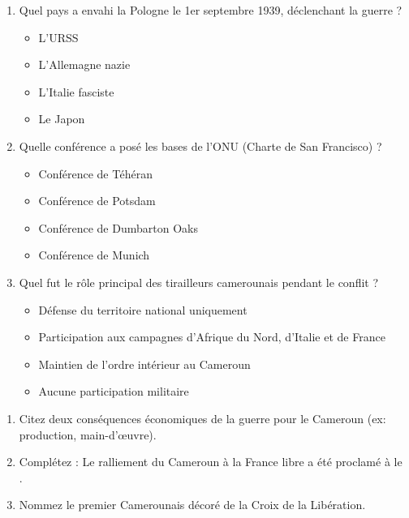 \documentclass[11pt]{article}
\begin{document}
\begin{exercice}
\begin{enumerate}
    \item Quel pays a envahi la Pologne le 1er septembre 1939, déclenchant la guerre ?
    \begin{itemize}
        \item[A.] L'URSS \item[B.] L'Allemagne nazie \item[C.] L'Italie fasciste \item[D.] Le Japon
    \end{itemize}
    \item Quelle conférence a posé les bases de l'ONU (Charte de San Francisco) ?
    \begin{itemize}
        \item[A.] Conférence de Téhéran \item[B.] Conférence de Potsdam \item[C.] Conférence de Dumbarton Oaks \item[D.] Conférence de Munich
    \end{itemize}
    \item Quel fut le rôle principal des tirailleurs camerounais pendant le conflit ?
    \begin{itemize}
        \item[A.] Défense du territoire national uniquement \item[B.] Participation aux campagnes d'Afrique du Nord, d'Italie et de France \item[C.] Maintien de l'ordre intérieur au Cameroun \item[D.] Aucune participation militaire
    \end{itemize}
\end{enumerate}
\end{exercice}

\begin{exercice}
\begin{enumerate}
    \item Citez deux conséquences économiques de la guerre pour le Cameroun (ex: production, main-d'œuvre).
    \item Complétez : Le ralliement du Cameroun à la France libre a été proclamé à \underline{\hspace{4cm}} le \underline{\hspace{3cm}}.
    \item Nommez le premier Camerounais décoré de la Croix de la Libération.
\end{enumerate}
\end{exercice}
\end{document}
